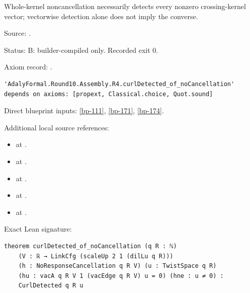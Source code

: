 \begin{theorem}[bp-175]
\label{bp-175}
\leanok
Whole-kernel noncancellation necessarily detects every nonzero crossing-kernel vector; vectorwise detection alone does not imply the converse.

\par Source: \texttt{}.
\par Status: B: builder-compiled only. Recorded exit 0.
\par Axiom record: \texttt{}.
\begin{verbatim}
'AdalyFormal.Round10.Assembly.R4.curlDetected_of_noCancellation' depends on axioms: [propext, Classical.choice, Quot.sound]
\end{verbatim}
\par Direct blueprint inputs: \ref{bp-111}, \ref{bp-171}, \ref{bp-174}.
\par Additional local source references:
\begin{itemize}
\item \texttt{} at \texttt{}.
\item \texttt{} at \texttt{}.
\item \texttt{} at \texttt{}.
\item \texttt{} at \texttt{}.
\item \texttt{} at \texttt{}.
\end{itemize}
\par Exact Lean signature:
\begin{verbatim}
theorem curlDetected_of_noCancellation (q R : ℕ)
    (V : ℝ → LinkCfg (scaleUp 2 1 (dilLu q R)))
    (h : NoResponseCancellation q R V) (u : TwistSpace q R)
    (hu : vacA q R V 1 (vacEdge q R V) u = 0) (hne : u ≠ 0) :
    CurlDetected q R u
\end{verbatim}
\end{theorem}


